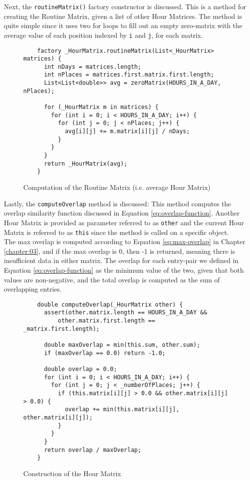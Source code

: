 Next, the \verb|routineMatrix()| factory constructor is discussed. This is a method for creating the Routine Matrix, given a list of other Hour Matrices. The method is quite simple since it uses two for loops to fill out an empty zero-matrix with the average value of each position indexed by \verb|i| and \verb|j|, for each matrix.\\

\begin{figure}[h]
    \centering
    \begin{verbatim}
    factory _HourMatrix.routineMatrix(List<_HourMatrix> matrices) {
      int nDays = matrices.length;
      int nPlaces = matrices.first.matrix.first.length;
      List<List<double>> avg = zeroMatrix(HOURS_IN_A_DAY, nPlaces);
    
      for (_HourMatrix m in matrices) {
        for (int i = 0; i < HOURS_IN_A_DAY; i++) {
          for (int j = 0; j < nPlaces; j++) {
            avg[i][j] += m.matrix[i][j] / nDays;
          }
        }
      }
      return _HourMatrix(avg);
    }
    \end{verbatim}
    \caption{Computation of the Routine Matrix (i.e. average Hour Matrix)}
    \label{fig:hour-matrix-average}
\end{figure}

Lastly, the \verb|computeOverlap| method is discussed: This method computes the overlap similarity function discussed in Equation \eqref{eq:overlap-function}. Another Hour Matrix is provided as parameter referred to as \verb|other| and the current Hour Matrix is referred to as \verb|this| since the method is called on a specific object. \\

The max overlap is computed according to Equation \eqref{eq:max-overlap} in Chapter \ref{chapter:03}, and if the max overlap is 0, then -1 is returned, meaning there is insufficient data in either matrix. The overlap for each entry-pair we defined in Equation \eqref{eq:overlap-function} as the minimum value of the two, given that both values are non-negative, and the total overlap is computed as the sum of overlapping entries.

\begin{figure}[h]
    \centering
    \begin{verbatim}
    double computeOverlap(_HourMatrix other) {
      assert(other.matrix.length == HOURS_IN_A_DAY &&
          other.matrix.first.length == _matrix.first.length);
    
      double maxOverlap = min(this.sum, other.sum);
      if (maxOverlap == 0.0) return -1.0;
    
      double overlap = 0.0;
      for (int i = 0; i < HOURS_IN_A_DAY; i++) {
        for (int j = 0; j < _numberOfPlaces; j++) {
          if (this.matrix[i][j] > 0.0 && other.matrix[i][j] > 0.0) {
            overlap += min(this.matrix[i][j], other.matrix[i][j]);
          }
        }
      }
      return overlap / maxOverlap;
    }
    \end{verbatim}
    \caption{Construction of the Hour Matrix}
    \label{fig:hour-matrix-overlap}
\end{figure}


